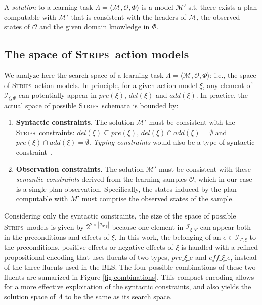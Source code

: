 \documentclass{article}
\newcommand{\tup}[1]{{\langle #1 \rangle}}
\newcommand{\strips}{\textsc{Strips}}
\begin{document}
A {\em solution} to a learning task $\Lambda=\tup{\mathcal{M},{\mathcal O},\Phi}$ is a model $\mathcal{M}'$ s.t. there exists a plan computable with $\mathcal{M}'$ that is consistent with the headers of $\mathcal{M}$, the observed states of $\mathcal{O}$ and the given domain knowledge in $\Phi$.

\subsection{The space of \strips\ action models}

We analyze here the search space of a learning task $\Lambda=\tup{\mathcal{M},{\mathcal O},\Phi}$; i.e., the space of \strips\ action models. In principle, for a given action model $\xi$, any element of ${\mathcal I}_{\xi,\Psi}$ can potentially appear in $pre(\xi)$, $del(\xi)$ and $add(\xi)$. In practice, the actual space of possible \strips\ schemata is bounded by:

\begin{enumerate}
\item {\bf Syntactic constraints}. The solution $\mathcal{M}'$ must be consistent with the \strips\ constraints: $del(\xi)\subseteq pre(\xi)$, $del(\xi)\cap add(\xi)=\emptyset$ and $pre(\xi)\cap add(\xi)=\emptyset$. {\em Typing constraints} would also be a type of syntactic constraint~\cite{mcdermott1998pddl}.
\item {\bf Observation constraints}. The solution $\mathcal{M}'$ must be consistent with these \emph{semantic constraints} derived from  the learning samples $\mathcal{O}$, which in our case is a single plan observation. Specifically, the states induced by the plan computable with $M'$ must comprise the observed states of the sample.
\end{enumerate}

Considering only the syntactic constraints, the size of the space of possible \strips\ models is given by $2^{2\times|{\mathcal I}_{\Psi,\xi}|}$ because one element in $\mathcal{I}_{\xi,\Psi}$ can appear both in the preconditions and effects of $\xi$. In this work, the belonging of an $e \in \mathcal{I}_{\Psi,\xi}$ to the preconditions, positive effects or negative effects of $\xi$ is handled with a refined propositional encoding that uses fluents of two types, $pre\_\xi\_e$ and $eff\_\xi\_e$, instead of the three fluents used in the BLS. The four possible combinations of these two fluents are sumarized in Figure \ref{fig:combinations}. This compact encoding allows for a more effective exploitation of the syntactic constraints, and also yields the solution space of $\Lambda$ to be the same as its search space.
\end{document}
